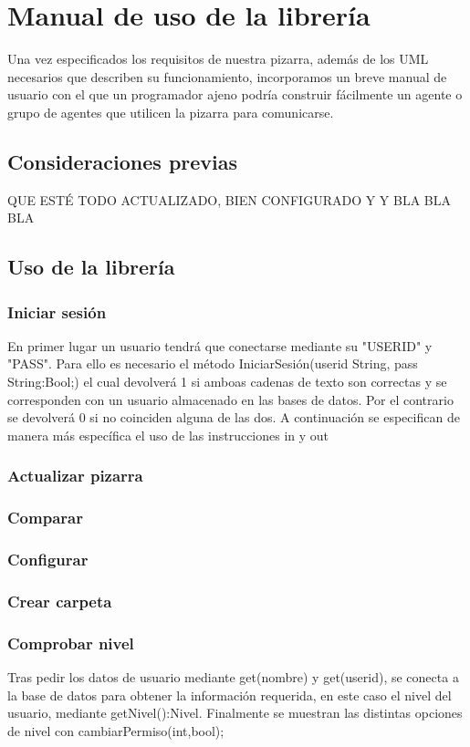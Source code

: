 \chapter{Manual de uso de la librería}
Una vez especificados los requisitos de nuestra pizarra, además de los UML necesarios que describen su funcionamiento, incorporamos un breve manual de usuario con el que un programador ajeno podría construir fácilmente un agente o grupo de agentes que utilicen la pizarra para comunicarse.

\section{Consideraciones previas}
\color{red}QUE ESTÉ TODO ACTUALIZADO, BIEN CONFIGURADO Y Y BLA BLA BLA
\color{black}
\section{Uso de la librería}
\subsection{Iniciar sesión}
En primer lugar un usuario tendrá que conectarse mediante su "USERID" y "PASS". Para ello es necesario el método IniciarSesión(userid String, pass String:Bool;) el cual devolverá 1 si amboas cadenas de texto son correctas y se corresponden con un usuario almacenado en las bases de datos. Por el contrario se devolverá 0 si no coinciden alguna de las dos.
A continuación se especifican de manera más específica el uso de las instrucciones in y out
\subsection{Actualizar pizarra}
\subsection{Comparar}
\subsection{Configurar}
\subsection{Crear carpeta}
\subsection{Comprobar nivel}Tras pedir los datos de usuario mediante get(nombre) y get(userid), se conecta a la base de datos para obtener la información requerida, en este caso el nivel del usuario, mediante getNivel():Nivel. Finalmente se muestran las distintas opciones de nivel con cambiarPermiso(int,bool);
